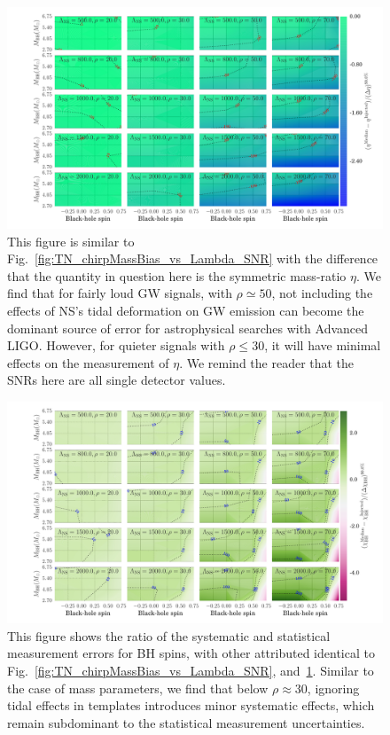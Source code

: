 \documentclass[aps,prd,amsmath,floats,floatfix, twocolumn,
superscriptaddress,nofootinbib,showpacs]{revtex4-1}
\begin{document}
\begin{figure}[!t]
\centering
\includegraphics[width=2\columnwidth]{plots/TNEtaBiasesOverCIWidths_CI90_0_Lambda_SNR20_70_linear}
\caption{This figure is similar to Fig.~\ref{fig:TN_chirpMassBias_vs_Lambda_SNR}
with the difference that the quantity in question here is the symmetric 
mass-ratio $\eta$. We find that for fairly loud GW signals, with $\rho\simeq 50$,
not including the effects of NS's tidal deformation on GW emission can become the dominant
source of error for astrophysical searches with Advanced LIGO. However,
for quieter signals with $\rho\leq 30$, it will have minimal effects on the measurement
of $\eta$. We remind the reader that the SNRs here are all single detector values.
}
\label{fig:TN_EtaBias_vs_Lambda_SNR}
\end{figure}
% 
% 
\begin{figure}
\centering
\includegraphics[width=1.95\columnwidth]{plots/TNChiBHBiasesOverCIWidths_CI90_0_Lambda_SNR_linear}
\caption{This figure shows the ratio of the systematic and statistical
measurement errors for BH spins, with other attributed identical to 
Fig.~\ref{fig:TN_chirpMassBias_vs_Lambda_SNR}, and~\ref{fig:TN_EtaBias_vs_Lambda_SNR}.
Similar to the case of mass parameters, we find that below
$\rho\approx 30$, ignoring tidal effects in templates introduces minor systematic effects,
which remain subdominant to the statistical measurement uncertainties.
}
\label{fig:TN_BHspinBias_vs_Lambda_SNR}
\end{figure}
\end{document}
